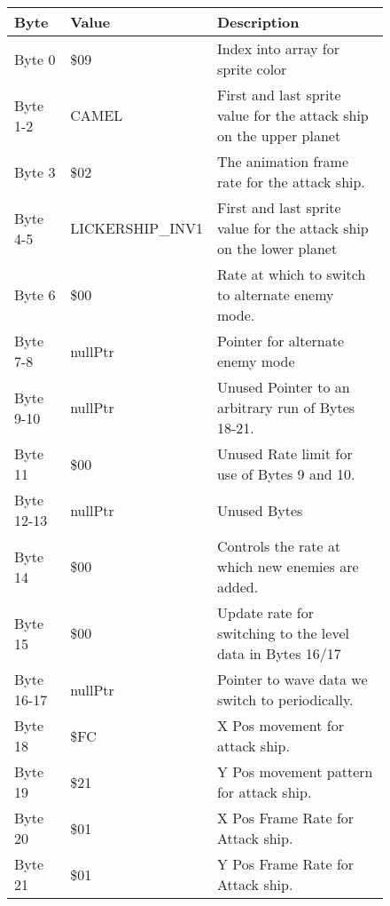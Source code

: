 \begin{figure}[H]
{\begin{adjustbox}{width=12cm}
\begin{tabular}{lll}
\toprule
 Byte       & Value                     & Description                                                         \\
\midrule
 Byte 0     & \$09                       & Index into array for sprite color                                   \\
 Byte 1-2   & CAMEL                     & First and last sprite value for the attack ship on the upper planet \\
 Byte 3     & \$02                       & The animation frame rate for the attack ship.                       \\
 Byte 4-5   & LICKERSHIP\_INV1           & First and last sprite value for the attack ship on the lower planet \\
 Byte 6     & \$00                       & Rate at which to switch to alternate enemy mode.                    \\
 Byte 7-8   & nullPtr                   & Pointer for alternate enemy mode                                    \\
 Byte 9-10  & nullPtr                   & Unused Pointer to an arbitrary run of Bytes 18-21.                  \\
 Byte 11    & \$00                       & Unused Rate limit for use of Bytes 9 and 10.                        \\
 Byte 12-13 & nullPtr                   & Unused Bytes                                                        \\
 Byte 14    & \$00                       & Controls the rate at which new enemies are added.                   \\
 Byte 15    & \$00                       & Update rate for switching to the level data in Bytes 16/17          \\
 Byte 16-17 & nullPtr                   & Pointer to wave data we switch to periodically.                     \\
 Byte 18    & \$FC                       & X Pos movement for attack ship.                                     \\
 Byte 19    & \$21                       & Y Pos movement pattern for attack ship.                             \\
 Byte 20    & \$01                       & X Pos Frame Rate for Attack ship.                                   \\
 Byte 21    & \$01                       & Y Pos Frame Rate for Attack ship.                                   \\

\end{tabular}
\end{adjustbox}}
\end{figure}
